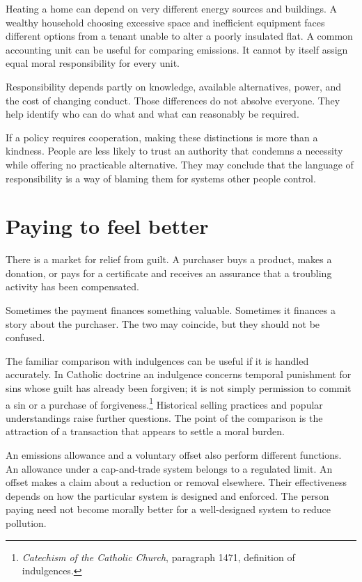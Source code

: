 \documentclass[12pt,a4paper]{book}
\begin{document}
Heating a home can depend on very different energy sources and buildings. A wealthy household choosing excessive space and inefficient equipment faces different options from a tenant unable to alter a poorly insulated flat. A common accounting unit can be useful for comparing emissions. It cannot by itself assign equal moral responsibility for every unit.

Responsibility depends partly on knowledge, available alternatives, power, and the cost of changing conduct. Those differences do not absolve everyone. They help identify who can do what and what can reasonably be required.

If a policy requires cooperation, making these distinctions is more than a kindness. People are less likely to trust an authority that condemns a necessity while offering no practicable alternative. They may conclude that the language of responsibility is a way of blaming them for systems other people control.

\section*{Paying to feel better}

There is a market for relief from guilt. A purchaser buys a product, makes a donation, or pays for a certificate and receives an assurance that a troubling activity has been compensated.

Sometimes the payment finances something valuable. Sometimes it finances a story about the purchaser. The two may coincide, but they should not be confused.

The familiar comparison with indulgences can be useful if it is handled accurately. In Catholic doctrine an indulgence concerns temporal punishment for sins whose guilt has already been forgiven; it is not simply permission to commit a sin or a purchase of forgiveness.\footnote{\emph{Catechism of the Catholic Church}, paragraph 1471, definition of indulgences.} Historical selling practices and popular understandings raise further questions. The point of the comparison is the attraction of a transaction that appears to settle a moral burden.

An emissions allowance and a voluntary offset also perform different functions. An allowance under a cap-and-trade system belongs to a regulated limit. An offset makes a claim about a reduction or removal elsewhere. Their effectiveness depends on how the particular system is designed and enforced. The person paying need not become morally better for a well-designed system to reduce pollution.
\end{document}
